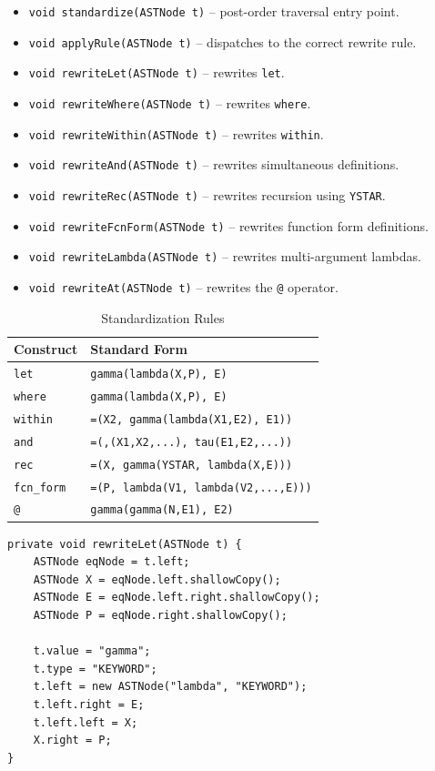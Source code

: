 \documentclass[12pt,a4paper]{article}
\begin{document}
\begin{itemize}
    \item \texttt{void standardize(ASTNode t)} -- post-order traversal entry point.
    \item \texttt{void applyRule(ASTNode t)} -- dispatches to the correct rewrite rule.
    \item \texttt{void rewriteLet(ASTNode t)} -- rewrites \texttt{let}.
    \item \texttt{void rewriteWhere(ASTNode t)} -- rewrites \texttt{where}.
    \item \texttt{void rewriteWithin(ASTNode t)} -- rewrites \texttt{within}.
    \item \texttt{void rewriteAnd(ASTNode t)} -- rewrites simultaneous definitions.
    \item \texttt{void rewriteRec(ASTNode t)} -- rewrites recursion using \texttt{YSTAR}.
    \item \texttt{void rewriteFcnForm(ASTNode t)} -- rewrites function form definitions.
    \item \texttt{void rewriteLambda(ASTNode t)} -- rewrites multi-argument lambdas.
    \item \texttt{void rewriteAt(ASTNode t)} -- rewrites the \texttt{@} operator.
\end{itemize}

\begin{table}[H]
\centering
\caption{Standardization Rules}
\label{tab:standardization-rules}
\begin{tabular}{ll}
\toprule
Construct & Standard Form \\
\midrule
\texttt{let} & \texttt{gamma(lambda(X,P), E)} \\
\texttt{where} & \texttt{gamma(lambda(X,P), E)} \\
\texttt{within} & \texttt{=(X2, gamma(lambda(X1,E2), E1))} \\
\texttt{and} & \texttt{=(,(X1,X2,...), tau(E1,E2,...))} \\
\texttt{rec} & \texttt{=(X, gamma(YSTAR, lambda(X,E)))} \\
\texttt{fcn\_form} & \texttt{=(P, lambda(V1, lambda(V2,...,E)))} \\
\texttt{@} & \texttt{gamma(gamma(N,E1), E2)} \\
\bottomrule
\end{tabular}
\end{table}

\begin{lstlisting}[style=javacode, caption={Standardizer.rewriteLet()}]
private void rewriteLet(ASTNode t) {
    ASTNode eqNode = t.left;
    ASTNode X = eqNode.left.shallowCopy();
    ASTNode E = eqNode.left.right.shallowCopy();
    ASTNode P = eqNode.right.shallowCopy();

    t.value = "gamma";
    t.type = "KEYWORD";
    t.left = new ASTNode("lambda", "KEYWORD");
    t.left.right = E;
    t.left.left = X;
    X.right = P;
}
\end{lstlisting}
\end{document}
